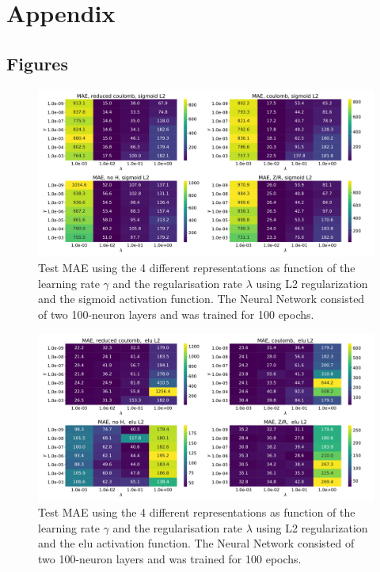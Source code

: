 \documentclass[11pt,a4paper,notitlepage]{article}
\begin{document}
\section{Appendix}
\subsection{Figures}
\begin{figure}[H]
\centering
\includegraphics[width=1\textwidth]{nn_100_sigmoid L2.pdf}
\caption[NN, sigmoid L2, 100 epochs]{Test MAE using the 4 different representations as function of the learning rate $\gamma$ and the regularisation rate $\lambda$ using L2 regularization and the sigmoid activation function. The Neural Network consisted of two 100-neuron layers and was trained for 100 epochs.} \label{fig:sigmoid_l2_100}
\end{figure}
\begin{figure}[H]
\centering
\includegraphics[width=1\textwidth]{nn_100_ elu L2.pdf}
\caption[NN, elu L2, 100 epochs]{Test MAE using the 4 different representations as function of the learning rate $\gamma$ and the regularisation rate $\lambda$ using L2 regularization and the elu activation function. The Neural Network consisted of two 100-neuron layers and was trained for 100 epochs.} \label{fig:elu_l2_100}
\end{figure}
\end{document}
